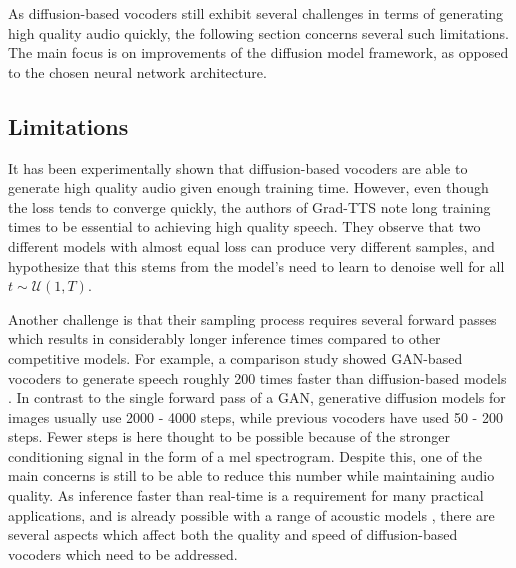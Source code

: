 \documentclass{report}
\begin{document}
As diffusion-based vocoders still exhibit several challenges in terms of generating high quality audio quickly, the following section concerns several such limitations. The main focus is on improvements of the diffusion model framework, as opposed to the chosen neural network architecture.

\subsection{Limitations} \label{sec:limitations}
It has been experimentally shown that diffusion-based vocoders are able to generate high quality audio given enough training time. However, even though the loss tends to converge quickly, the authors of Grad-TTS \cite{popov2021grad} note long training times to be essential to achieving high quality speech. They observe that two different models with almost equal loss can produce very different samples, and hypothesize that this stems from the model's need to learn to denoise well for all $t \sim \mathcal{U}(1, T)$.

Another challenge is that their sampling process requires several forward passes which results in considerably longer inference times compared to other competitive models. For example, a comparison study showed GAN-based vocoders to generate speech roughly 200 times faster than diffusion-based models \cite{albadawy2022vocbench}. In contrast to the single forward pass of a GAN, generative diffusion models for images usually use 2000 - 4000 steps, while previous vocoders have used 50 - 200 steps. Fewer steps is here thought to be possible because of the stronger conditioning signal in the form of a mel spectrogram. Despite this, one of the main concerns is still to be able to reduce this number while maintaining audio quality. As inference faster than real-time is a requirement for many practical applications, and is already possible with a range of acoustic models \cite{ren2020fastspeech, luo2021lightspeech}, there are several aspects which affect both the quality and speed of diffusion-based vocoders which need to be addressed.
\end{document}
